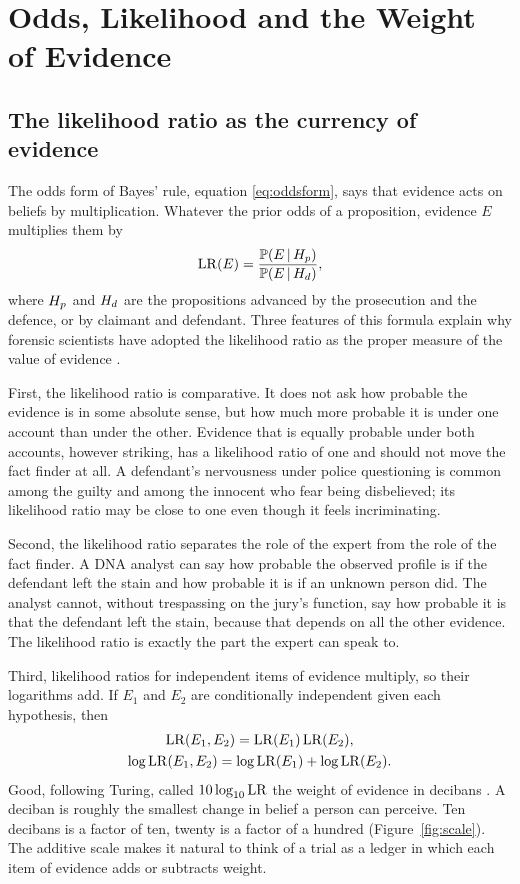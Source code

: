 \chapter{Odds, Likelihood and the Weight of Evidence}
\label{ch:odds}

\section{The likelihood ratio as the currency of evidence}

The odds form of Bayes' rule, equation \eqref{eq:oddsform}, says that evidence acts on beliefs by multiplication. Whatever the prior odds of a proposition, evidence $E$ multiplies them by
\begin{equation}
\mathrm{LR}(E) = \frac{\mathbb{P}(E \,\vert\, H_{p})}{\mathbb{P}(E \,\vert\, H_{d})},
\end{equation}
where $H_{p}$ and $H_{d}$ are the propositions advanced by the prosecution and the defence, or by claimant and defendant. Three features of this formula explain why forensic scientists have adopted the likelihood ratio as the proper measure of the value of evidence \citep{aitken_taroni2004,evett1998}.

First, the likelihood ratio is comparative. It does not ask how probable the evidence is in some absolute sense, but how much more probable it is under one account than under the other. Evidence that is equally probable under both accounts, however striking, has a likelihood ratio of one and should not move the fact finder at all. A defendant's nervousness under police questioning is common among the guilty and among the innocent who fear being disbelieved; its likelihood ratio may be close to one even though it feels incriminating.

Second, the likelihood ratio separates the role of the expert from the role of the fact finder. A DNA analyst can say how probable the observed profile is if the defendant left the stain and how probable it is if an unknown person did. The analyst cannot, without trespassing on the jury's function, say how probable it is that the defendant left the stain, because that depends on all the other evidence. The likelihood ratio is exactly the part the expert can speak to.

Third, likelihood ratios for independent items of evidence multiply, so their logarithms add. If $E_1$ and $E_2$ are conditionally independent given each hypothesis, then
\begin{gather}
\mathrm{LR}(E_1, E_2) = \mathrm{LR}(E_1)\,\mathrm{LR}(E_2),\\
\log \mathrm{LR}(E_1,E_2) = \log\mathrm{LR}(E_1) + \log \mathrm{LR}(E_2).
\end{gather}
Good, following Turing, called $10\log_{10}\mathrm{LR}$ the weight of evidence in decibans \citep{good1950,good1979}. A deciban is roughly the smallest change in belief a person can perceive. Ten decibans is a factor of ten, twenty is a factor of a hundred (Figure~\ref{fig:scale}). The additive scale makes it natural to think of a trial as a ledger in which each item of evidence adds or subtracts weight.


